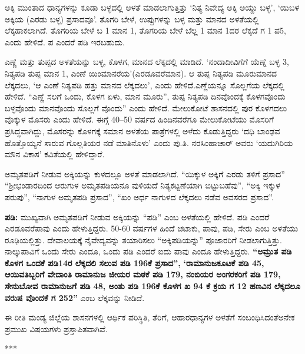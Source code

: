 ಅಕ್ಕಿ ಮುಂತಾದ ಧಾನ್ಯಗಳನ್ನು ಕೂಡಾ ಬಳ್ಳದಲ್ಲಿ ಅಳತೆ ಮಾಡಲಾಗುತ್ತಿತ್ತು ‘ನಿತ್ಯ ನಿವೇದ್ಯ ಅಕ್ಕಿ ಅಯ್ದು ಬಳ್ಳ’, ‘ಯಿಬಳ ಅಕ್ಕಿಯ (ಎರಡು ಬಳ್ಳ) ಪ್ರಸಾದವೂ’. ತೊಗರಿ ಬೇಳೆ, ಉಪ್ಪುಗಳನ್ನು ಬಳ್ಳ ಮತ್ತು ಮಾನದ ಅಳತೆಯಲ್ಲಿ ಲೆಕ್ಕಹಾಕಲಾಗಿದೆ. ತೊಗರಿಯ ಬೇಳೆ ಬ 1 ಮಾನ 1, ತೊಗರಿಯ ಬೇಳೆ ಬೆಲ್ಲ 1 ಮಾನ 1ದರ ಲೆಕ್ಕದೆ ಗ 1 ಪ5, ಎಂದು ಹೇಳಿದೆ. ಪ ಎಂದರೆ ಪಡಿ ಇರಬಹುದು.

ಎಣ್ಣೆ ಮತ್ತು ತುಪ್ಪದ ಅಳತೆಯನ್ನು ಬಳ್ಳ, ಕೊಳಗ, ಮಾನದ ಲೆಕ್ಕದಲ್ಲಿ ಮಾಡಿದೆ. ‘ನಂದಾದೀವಿಗೆಗೆ ಯೆಣ್ನೆ ಬಳ್ಳ 3, ನಿತ್ಯಪಡಿ ತುಪ್ಪ ಮಾನ 1, ಎಂಣೆ ಯಿಂಮಾನರೆಯ’(ಎರಡೂವರೆಮಾನ). ಆ ತುಪ್ಪ ನಿತ್ಯಪಡಿ ಮೂರುಮಾನದ ಲೆಕ್ಕದಲು, ‘ಆ ಎಂಣೆ ನಿತ್ಯಪಡಿ ಹತ್ತು ಮಾನದ ಲೆಕ್ಕದಲು’, ಎಂದು ಹೇಳಿದೆ.ಎಣ್ಣೆಯನ್ನೂ ಸೊಲ್ಲಗೆಯ ಲೆಕ್ಕದಲ್ಲಿ ಹೇಳಿದೆ. “ಎಣ್ಣೆ ಸಲಗೆ ಒಂದು, ಕೊಳಗ ಏಳು, ಮಾನ ಮೂರು”, ತುಪ್ಪ ನಿತ್ಯಪಡಿ ದಿನವೊಂದಕ್ಕೆ ಕೊಳಗವೊಂದು ಬಳ್ಳವೊಂದು ಮಾನವೊಂದು ಸೊಲ್ಲಗೆ ವೊಂದು” ಎಂದು ಹೇಳಿದೆ. ಮೇಲುಕೋಟೆ ಶಾಸನದಲ್ಲಿ ಪುರ ಕೊಳಗದಲು ವೊಕ್ಕುಳ ಮೊಸರು ಎಂದು ಹೇಳಿದೆ. ಈಗ್ಗೆ 40–50 ವರ್ಷದ ಹಿಂದಿನವರೆಗೂ ಮೇಲುಕೋಟೆಯು ಮೊಸರಿಗೆ ಪ್ರಸಿದ್ಧವಾಗಿದ್ದು, ಮೊಸರನ್ನು ಕೊಳಗಕ್ಕೆ ಸಮಾನ ಅಳತೆಯ ಪಾತ್ರೆಗಳಲ್ಲಿ ಅಳೆದು ಕೊಡುತ್ತಿದ್ದರು ‘ದಧಿ ಬಾಂಢವ ಹೊತ್ತೊಯ್ಯನೆ ಸಾರುವ ಗೊಲ್ಲತಿಯರ ನಡೆ ಮಾತಿ\-ನೊಳು’ ಎಂದು ಪು.ತಿ. ನರಸಿಂಹಾಚಾರ್ ಅವರು ‘ಯದುಗಿರಿಯ ಮೌನ ವಿಕಾಸ’ ಕವಿತೆಯಲ್ಲಿ ಹೇಳಿದ್ದಾರೆ.

ಅಮೃತಪಡಿಗೆ ನೀಡುವ ಅಕ್ಕಿಯನ್ನು ಕುಳದಲ್ಲೂ ಅಳತೆ ಮಾಡಲಾಗಿದೆ. “ಯಿಕ್ಕುಳ ಅಕ್ಕಿಗೆ ಎರಡು ತಳಿಗೆ ಪ್ರಸಾದ” “ಶ‍್ರೀಭಂಡಾರದಿಂದ ಆರುಗುಳ ಅಮೃತಪಡಿಯನೂ ವುಳಿಯದೆ ನಿತ್ಯಕಟ್ಟಣೆಯಾಗಿ ಬಿಟ್ಟುಬಹೆವು”, “ಅಕ್ಕಿ ಇಕ್ಕುಳ ಪರುಪು”, “ನಾಗುಳ ಅಮೃತಪಡಿ ಪ್ರಸಾದ”, “ಖಂ ಅರ್ಧ ನಾಗುಳದ ಲೆಕ್ಕದಲು ನಡೆವ ಅವಸರದ ಪ್ರಸಾದ”.

\textbf{ಪಡಿ:} ಮುಖ್ಯವಾಗಿ ಅಮೃತಪಡಿಗೆ ನೀಡುವ ಅಕ್ಕಿಯನ್ನು “ಪಡಿ” ಎಂಬ ಅಳತೆಯಲ್ಲಿ ಹೇಳಿದೆ. ಪಡಿ ಎಂದರೆ ಎರಡೂವರೆಪಾವು ಎಂದು ಹೇಳುತ್ತಿದ್ದರು. 50-60 ವರ್ಷಗಳ ಹಿಂದೆ ಚಟಾಕು, ಪಾವು, ಪಡಿ, ಸೇರು ಎಂಬ ಅಳತೆಯು ರೂಢಿಯಲ್ಲಿತ್ತು. ದೇವಾಲಯಕ್ಕೆ ನೈವೇದ್ಯವನ್ನು ತಯಾರಿಸಲು “ಅಕ್ಕಿಪಡಿಯನ್ನು” ಪೂಜಾರರಿಗೆ ನೀಡಲಾಗುತ್ತಿತ್ತು. ನಾಲ್ಕುಪಾವಿಗೆ ಒಂದು ಸೇರು ಎಂದೂ, ಒಂದು ಪಡಿ ಎಂದರೆ ಐದು ಪಾವು ಎಂದೂ ಹೇಳುತ್ತಿದ್ದರು. \textbf{“ಅಮ್ರುತ ಪಡಿ ಕೊಳಗ ಒಂದಕೆ ಪಡಿ14ರ ಲೆಕ್ಕದಲಿ ಸಲುವ ಪಡಿ 196ಕೆ ಪ್ರಸಾದ”,} \textbf{‘ರಾಮಾನುಜಕೂಟಕೆ ಪಡಿ 45, ಆಯಿವತಿಬ್ಬರಿಗೆ ವೇದಾಂತಿ ರಾಮಾನುಜ ಜೀಯರ ಮಠಕೆ ಪಡಿ 179, ನಂಬಿಯರ ಅಂಗರಕರಿಗೆ ಪಡಿ 179, ಸೇನುಬೋವ ರಾಮಾನುಜಗೆ ಪಡಿ 48, ಅಂತು ಪಡಿ 196ಕೆ ಕೊಳಗ ಖ 94 ಕೆ ಕ್ರಯ ಗ 12 ಹಣವಿನ ಲೆಕ್ಕದಲೂ ವರುಷ ವೊಂದಕೆ ಗ 252”} ಎಂಬ ಲೆಕ್ಕವನ್ನು ನೀಡಿದೆ.

ಈ ರೀತಿ ಮಂಡ್ಯ ಜಿಲ್ಲೆಯ ಶಾಸನಗಳಲ್ಲಿ ಆರ್ಥಿಕ ಪರಿಸ್ಥಿತಿ, ತೆರಿಗೆ, ಆಹಾರಧಾನ್ಯಗಳ ಅಳತೆಗೆ ಸಂಬಂಧಿಸಿದಂತೆ\break ಅನೇಕ ಪ್ರಮುಖ ವಿಷಯಗಳು ಪ್ರಸ್ತಾಪಿತವಾಗಿವೆ.

\begin{center}
***
\end{center}

\theendnotes
